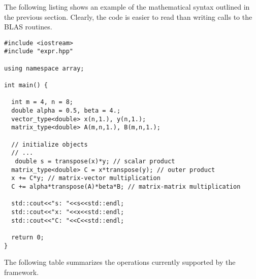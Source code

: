 \documentclass[11pt]{article}
\begin{document}
The following listing shows an example of the mathematical syntax outlined in the previous section.
Clearly, the code is easier to read than writing calls to the BLAS routines. \begin{lstlisting}[caption={Example usage}, label=lst:usage]
#include <iostream>
#include "expr.hpp"

using namespace array;

int main() {
  
  int m = 4, n = 8;
  double alpha = 0.5, beta = 4.;
  vector_type<double> x(n,1.), y(n,1.);
  matrix_type<double> A(m,n,1.), B(m,n,1.);
  
  // initialize objects
  // ...
   double s = transpose(x)*y; // scalar product
  matrix_type<double> C = x*transpose(y); // outer product
  x += C*y; // matrix-vector multiplication
  C += alpha*transpose(A)*beta*B; // matrix-matrix multiplication
  
  std::cout<<"s: "<<s<<std::endl;
  std::cout<<"x: "<<x<<std::endl;
  std::cout<<"C: "<<C<<std::endl;
    
  return 0;
}  
\end{lstlisting}

The following table summarizes the operations currently supported by the framework.
\end{document}
